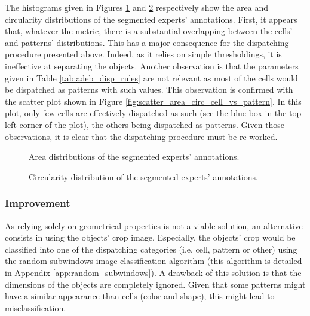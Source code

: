 The histograms given in Figures \ref{fig:hist_area_cell_vs_pattern} and \ref{fig:hist_circ_cell_vs_pattern} respectively show the area and circularity distributions of the segmented experts' annotations. First, it appears that, whatever the metric, there is a substantial overlapping between the cells' and patterns' distributions. This has a major consequence for the dispatching procedure presented above. Indeed, as it relies on simple thresholdings, it is ineffective at separating the objects. Another observation is that the parameters given in Table \ref{tab:adeb_disp_rules} are not relevant as most of the cells would be dispatched as patterns with such values. This observation is confirmed with the scatter plot shown in Figure \ref{fig:scatter_area_circ_cell_vs_pattern}. In this plot, only few cells are effectively dispatched as such (see the blue box in the top left corner of the plot), the others being dispatched as patterns. Given those observations, it is clear that the dispatching procedure must be re-worked.

\begin{figure}
	\center
	\caption{Area distributions of the segmented experts' annotations.}
	\label{fig:hist_area_cell_vs_pattern}
\end{figure}

\begin{figure}
	\center
	\caption{Circularity distribution of the segmented experts' annotations.}
	\label{fig:hist_circ_cell_vs_pattern}
\end{figure}


\subsubsection{Improvement}

As relying solely on geometrical properties is not a viable solution, an alternative consists in using the objects' crop image. Especially, the objects' crop would be classified into one of the dispatching categories (i.e. cell, pattern or other) using the random subwindows image classification algorithm \cite{Maree201617} (this algorithm is detailed in Appendix \ref{app:random_subwindows}). A drawback of this solution is that the dimensions of the objects are completely ignored. Given that some patterns might have a similar appearance than cells (color and shape), this might lead to misclassification. 

